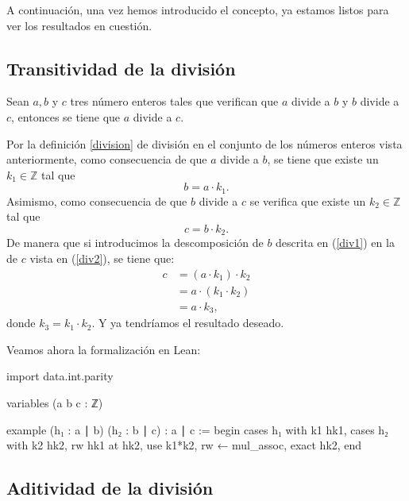 A continuación, una vez hemos introducido el concepto, ya estamos listos
para ver los resultados en cuestión.

\subsection{Transitividad de la división}

\begin{teorema}
  Sean \(a, b\) y \(c\) tres número enteros tales que verifican que
  \(a\) divide a \(b\) y \(b\) divide a \(c\), entonces se tiene que
  \(a\) divide a \(c\).
\end{teorema}

\begin{demostracion}
  Por la definición \ref{division} de división en el conjunto de los
  números enteros vista anteriormente, como consecuencia de que \(a\)
  divide a \(b\), se tiene que existe un \(k_1 ∈ ℤ\) tal que
  \begin{equation}\label{div1}
    b = a · k_1.
  \end{equation}
  Asimismo, como consecuencia de que \(b\) divide a \(c\) se verifica
  que existe un \(k_2 ∈ ℤ\) tal que
  \begin{equation}\label{div2}
    c = b · k_2.
  \end{equation}
  De manera que si introducimos la descomposición de \(b\) descrita en
  (\ref{div1}) en la de \(c\) vista en (\ref{div2}), se tiene que:
  \[\begin{array}{ll}
      c & = (a · k_1) · k_2\\
        & = a · (k_1 · k_2) \\
        & = a · k_3,
    \end{array}\]
  donde \(k_3 = k_1 · k_2\). Y ya tendríamos el resultado deseado.
\end{demostracion}

Veamos ahora la formalización en Lean:
\begin{leancode}
import data.int.parity

variables (a b c : ℤ)

example (h₁ : a ∣ b) (h₂ : b ∣ c) : a ∣ c :=
begin
  cases h₁ with k1 hk1,
  cases h₂ with k2 hk2,
  rw hk1 at hk2,
  use k1*k2,
  rw ← mul_assoc,
exact hk2,
end
\end{leancode}

\subsection{Aditividad de la división}

